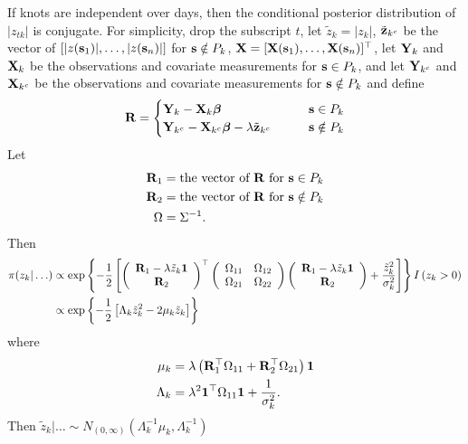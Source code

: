 If knots are independent over days, then the conditional posterior distribution of $|z_{tk}|$ is conjugate.
For simplicity, drop the subscript $t$, let $\tilde{z}_{k} = |z_{k}|$, $\tilde{\mathbf{z}}_{k^c}$ be the vector of $[|z(\mathbf{s}_1)|, \ldots, |z(\mathbf{s}_n)|]$ for $\mathbf{s} \notin P_k$, $\mathbf{X} = [\mathbf{X}(\mathbf{s}_1), \ldots, \mathbf{X}(\mathbf{s}_n)]^\top$, let $\mathbf{Y}_k$ and $\mathbf{X}_k$ be the observations and covariate measurements for $\mathbf{s} \in P_k$, and let $\mathbf{Y}_{k^c}$ and $\mathbf{X}_{k^c}$ be the observations and covariate measurements for $\mathbf{s} \notin P_k$ and define
\begin{align*}
\mathbf{R} = \begin{cases}
        \mathbf{Y}_k - \mathbf{X}_k \mbox{\boldmath $\beta$} & \mathbf{s} \in P_k\\
        \mathbf{Y}_{k^c} - \mathbf{X}_{k^c} \mbox{\boldmath $\beta$} - \lambda \tilde{\mathbf{z}}_{k^c} \qquad & \mathbf{s} \notin P_k
        \end{cases}
\end{align*}
Let
\begin{align*}
    \mathbf{R}_1 &= \text{the vector of } \mathbf{R} \text{ for } \mathbf{s} \in P_k \\
    \mathbf{R}_2 &= \text{the vector of } \mathbf{R} \text{ for } \mathbf{s} \notin P_k \\
    \Omega &= \Sigma^{-1}.
\end{align*}
Then
\begin{align*}
    \pi(z_k | \ldots) &\propto \exp \left\{ -\frac{ 1 }{ 2 } \left[
        \left( \begin{array}{c}
            \mathbf{R}_1 - \lambda \tilde{z}_k \mathbf{1}\\
            \mathbf{R}_2
        \end{array} \right)^\top
        \left( \begin{array}{cc}
            \Omega_{11} & \Omega_{12}\\
            \Omega_{21} & \Omega_{22}
        \end{array} \right)
        \left( \begin{array}{c}
            \mathbf{R}_1 - \lambda \tilde{z}_k \mathbf{1}\\
            \mathbf{R}_2
        \end{array} \right)
        +  \frac{ {\tilde{z}_k}^2 }{ \sigma_k^2 }\right]
    \right\} I \left(z_k > 0 \right) \\
        &\propto \exp \left\{ -\frac{ 1 }{ 2 } \left[ \Lambda_k {\tilde{z}_k}^2 - 2 \mu_k \tilde{z}_k \right] \right\}
\end{align*}
where
\begin{align*}
    \mu_k &= \lambda \left( \mathbf{R}_1^\top \Omega_{11} + \mathbf{R}_2^\top \Omega_{21} \right)\mathbf{1}\\
    \Lambda_k &= \lambda^2 \mathbf{1}^\top \Omega_{11} \mathbf{1} + \frac{ 1 }{ \sigma^2_k }.
\end{align*}
Then $\tilde{z}_k | \ldots \sim N_{(0, \infty)} \left(\Lambda_k^{-1} \mu_k, \Lambda_k^{-1} \right)$

